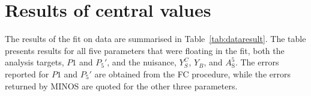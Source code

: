 \section{Results of central values}
\label{sec:res-centval}

The results of the fit on data are summarised in Table~\ref{tab:dataresult}.
The table presents results for all five parameters that were floating in the fit, both the analysis targets, $P1$ and $P_5'$, and the nuisance, $Y^{C}_{S}$, $Y_{B}$, and $A^5_\mathrm{S}$.
The errors reported for $P1$ and $P_5'$ are obtained from the FC procedure, while the errors returned by MINOS are quoted for the other three parameters.


